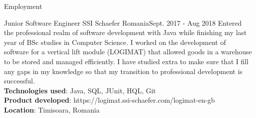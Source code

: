 \documentclass[]{mcdowellcv}
\begin{document}
\begin{cvsection}{Employment}
		\begin{cvsubsection}{Junior Software Engineer }{SSI Schaefer Romania}{Sept. 2017 - Aug 2018}
			\hspace{\parindent} \hspace{\parindent} \hspace{\parindent} \hspace{\parindent}  Entered the professional realm of software development with Java while finishing my last year of BSc studies in Computer Science. I worked on the development of software for a vertical lift module (LOGIMAT) that allowed goods in a warehouse to be stored and managed efficiently. I have studied extra to make sure that I fill any gaps in my knowledge so that my transition to professional development is successful.
      		\\ \textbf{Technologies used}: Java, SQL, JUnit, HQL, Git
		    \\ \textbf{Product developed}: https://logimat.ssi-schaefer.com/logimat-en-gb
			\\ \textbf{Location}: Timisoara, Romania
		\end{cvsubsection}
		
  \end{cvsection}
\end{document}
